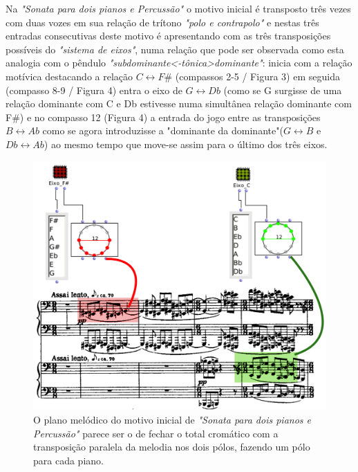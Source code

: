 \documentclass[
	12pt,				%
	openright,			%
	twoside,			%
	a4paper,			%
	english,			%
	french,				%
	spanish,			%
	brazil				%
	]{abntex2}
\begin{document}
 
Na \textit{"Sonata para dois pianos e Percussão"} o motivo inicial é transposto três vezes com duas vozes em sua relação de trítono \textit{"polo e contrapolo"} e nestas três entradas consecutivas deste motivo é apresentando com as três transposições possíveis do \textit{"sistema de eixos"}, numa relação que pode ser observada como esta analogia com o pêndulo \textit{"subdominante<-tônica>dominante"}: inicia com a relação motívica destacando a relação $C \leftrightarrow F\#$ (compassos 2-5 / Figura 3) em seguida (compasso 8-9 / Figura 4) entra o eixo de $G \leftrightarrow Db$ (como se G surgisse de uma relação dominante com C e Db estivesse numa simultânea relação dominante com F\#) e no compasso 12 (Figura 4) a entrada do jogo entre as transposições $B \leftrightarrow Ab$ como se agora introduzisse a "dominante da dominante"($G \leftrightarrow B$ e $Db \leftrightarrow Ab$) ao mesmo tempo que move-se assim para o último dos três eixos.

\begin{figure}[!h]
	\caption{\label{fig_grafico}O plano melódico do motivo inicial de \textit{"Sonata para dois pianos e Percussão"}  parece ser o de fechar o total cromático com a transposição paralela da melodia nos dois pólos, fazendo um pólo para cada piano. }
	\begin{center}
	    \includegraphics[scale=0.3]{axis/sonata2pianos_dofasus.png}
	\end{center}
\end{figure}
\end{document}
